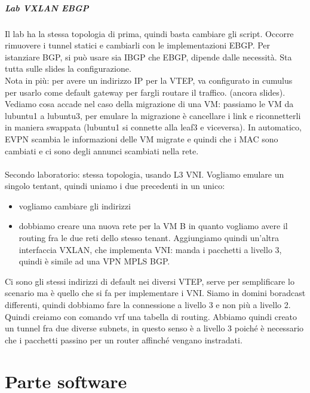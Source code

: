 \documentclass[12pt, oneside]{extbook} %
\begin{document}
\subsubsection{Lab VXLAN EBGP}
Il lab ha la stessa topologia di prima, quindi basta cambiare gli script. Occorre rimuovere i tunnel statici e cambiarli con le implementazioni EBGP. Per istanziare BGP, si può usare sia IBGP che EBGP, dipende dalle necessità. Sta tutta sulle slides la configurazione.
\\Nota in più: per avere un indirizzo IP per la VTEP, va configurato in cumulus per usarlo come default gateway per fargli routare il traffico. (ancora slides).\\Vediamo cosa accade nel caso della migrazione di una VM: passiamo le VM da lubuntu1 a lubuntu3, per emulare la migrazione è cancellare i link e riconnetterli in maniera swappata (lubuntu1 si connette alla leaf3 e viceversa). In automatico, EVPN scambia le informazioni delle VM migrate e quindi che i MAC sono cambiati e ci sono degli annunci scambiati nella rete.\\\\Secondo laboratorio: stessa topologia, usando L3 VNI. Vogliamo emulare un singolo tentant, quindi uniamo i due precedenti in un unico:
\begin{itemize}
\item vogliamo cambiare gli indirizzi
\item dobbiamo creare una nuova rete per la VM B in quanto vogliamo avere il routing fra le due reti dello stesso tenant. Aggiungiamo quindi un'altra interfaccia VXLAN, che implementa VNI: manda i pacchetti a livello 3, quindi è simile ad una VPN MPLS BGP.
\end{itemize}
Ci sono gli stessi indirizzi di default nei diversi VTEP, serve per semplificare lo scenario ma è quello che si fa per implementare i VNI. Siamo in domini boradcast differenti, quindi dobbiamo fare la connessione a livello 3 e non più a livello 2. Quindi creiamo con comando vrf una tabella di routing. Abbiamo quindi creato un tunnel fra due diverse subnets, in questo senso è a livello 3 poiché è necessario che i pacchetti passino per un router affinché vengano instradati.





\newpage

\part{Parte software}
\end{document}
